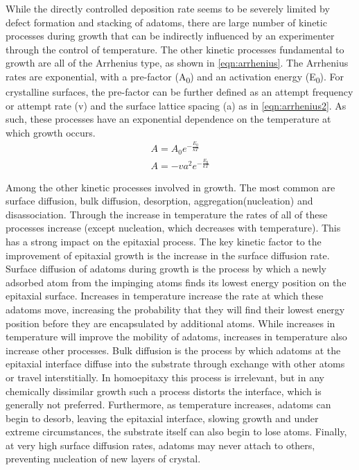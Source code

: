 While the directly controlled deposition rate seems to be severely limited by defect formation and stacking of adatoms, there are large number of kinetic processes during growth that can be indirectly influenced by an experimenter through the control of temperature.
The other kinetic processes fundamental to growth are all of the Arrhenius type, as shown in \cref{eqn:arrhenius}.
The Arrhenius rates are exponential, with a pre-factor (A\textsubscript{0}) and an activation energy (E\textsubscript{0}).
For crystalline surfaces, the pre-factor can be further defined as an attempt frequency or attempt rate (v) and the surface lattice spacing (a) as in \cref{eqn:arrhenius2}\cite{Einax2013}.
As such, these processes have an exponential dependence on the temperature at which growth occurs.
\begin{align}
    A = A_0 e^{-\frac{E_0}{kT}} \label{eqn:arrhenius} \\
    A = - v a^2 e^{-\frac{E_0}{kT}} \label{eqn:arrhenius2}
\end{align}

Among the other kinetic processes involved in growth. The most common are surface diffusion, bulk diffusion, desorption, aggregation(nucleation) and disassociation.
Through the increase in temperature the rates of all of these processes increase (except nucleation, which decreases with temperature).
This has a strong impact on the epitaxial process.
The key kinetic factor to the improvement of epitaxial growth is the increase in the surface diffusion rate.
Surface diffusion of adatoms during growth is the process by which a newly adsorbed atom from the impinging atoms finds its lowest energy position on the epitaxial surface.
Increases in temperature increase the rate at which these adatoms move, increasing the probability that they will find their lowest energy position before they are encapsulated by additional atoms.
While increases in temperature will improve the mobility of adatoms, increases in temperature also increase other processes.
Bulk diffusion is the process by which adatoms at the epitaxial interface diffuse into the substrate through exchange with other atoms or travel interstitially.
In homoepitaxy this process is irrelevant, but in any chemically dissimilar growth such a process distorts the interface, which is generally not preferred.
Furthermore, as temperature increases, adatoms can begin to desorb, leaving the epitaxial interface, slowing growth and under extreme circumstances, the substrate itself can also begin to lose atoms.
Finally, at very high surface diffusion rates, adatoms may never attach to others, preventing nucleation of new layers of crystal.

